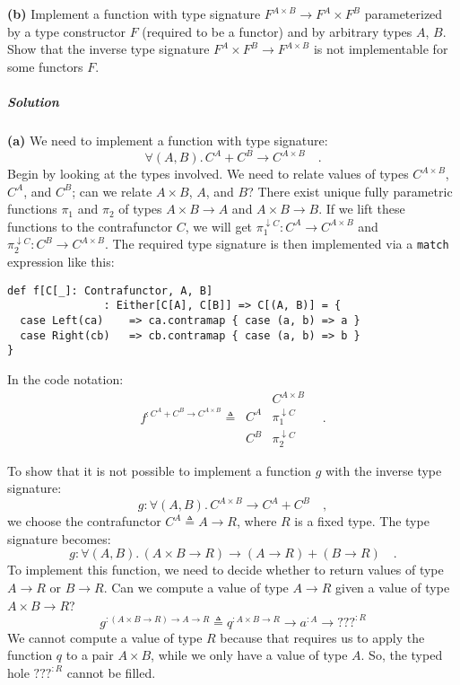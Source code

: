 \textbf{(b)} Implement a function with type signature $F^{A\times B}\rightarrow F^{A}\times F^{B}$
parameterized by a type constructor $F$ (required to be a functor)
and by arbitrary types $A$, $B$. Show that the inverse type signature
$F^{A}\times F^{B}\rightarrow F^{A\times B}$ is not implementable
for some functors $F$.

\subparagraph{Solution}

\textbf{(a)} We need to implement a function with type signature:
\[
\forall(A,B).\,C^{A}+C^{B}\rightarrow C^{A\times B}\quad.
\]
Begin by looking at the types involved. We need to relate values of
types $C^{A\times B}$, $C^{A}$, and $C^{B}$; can we relate $A\times B$,
$A$, and $B$? There exist unique fully parametric functions $\pi_{1}$
and $\pi_{2}$ of types $A\times B\rightarrow A$ and $A\times B\rightarrow B$.
If we lift these functions to the contrafunctor $C$, we will get
$\pi_{1}^{\downarrow C}:C^{A}\rightarrow C^{A\times B}$ and $\pi_{2}^{\downarrow C}:C^{B}\rightarrow C^{A\times B}$.
The required type signature is then implemented via a \lstinline!match!
expression like this:
\begin{lstlisting}
def f[C[_]: Contrafunctor, A, B]
               : Either[C[A], C[B]] => C[(A, B)] = {
  case Left(ca)    => ca.contramap { case (a, b) => a }
  case Right(cb)   => cb.contramap { case (a, b) => b }
}
\end{lstlisting}
In the code notation:
\[
f^{:C^{A}+C^{B}\rightarrow C^{A\times B}}\triangleq\,\begin{array}{|c||c|}
 & C^{A\times B}\\
\hline C^{A} & \pi_{1}^{\downarrow C}\\
C^{B} & \pi_{2}^{\downarrow C}
\end{array}\quad.
\]

To show that it is not possible to implement a function $g$ with
the inverse type signature:
\[
g:\forall(A,B).\,C^{A\times B}\rightarrow C^{A}+C^{B}\quad,
\]
we choose the contrafunctor $C^{A}\triangleq A\rightarrow R$, where
$R$ is a fixed type. The type signature becomes:
\[
g:\forall(A,B).\,(A\times B\rightarrow R)\rightarrow(A\rightarrow R)+(B\rightarrow R)\quad.
\]
To implement this function, we need to decide whether to return values
of type $A\rightarrow R$ or $B\rightarrow R$. Can we compute a value
of type $A\rightarrow R$ given a value of type $A\times B\rightarrow R$?
\[
g^{:(A\times B\rightarrow R)\rightarrow A\rightarrow R}\triangleq q^{:A\times B\rightarrow R}\rightarrow a^{:A}\rightarrow\text{???}^{:R}
\]
We cannot compute a value of type $R$ because that requires us to
apply the function $q$ to a pair $A\times B$, while we only have
a value of type $A$. So, the typed hole $\text{???}^{:R}$ cannot
be filled. 

